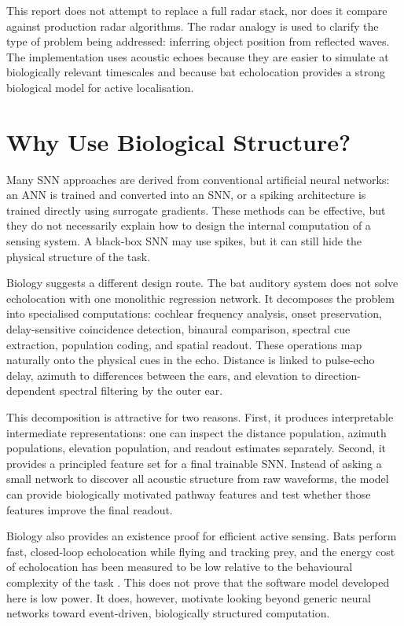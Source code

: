 This report does not attempt to replace a full radar stack, nor does it compare against production radar algorithms. The radar analogy is used to clarify the type of problem being addressed: inferring object position from reflected waves. The implementation uses acoustic echoes because they are easier to simulate at biologically relevant timescales and because bat echolocation provides a strong biological model for active localisation.

\section{Why Use Biological Structure?}

Many SNN approaches are derived from conventional artificial neural networks: an ANN is trained and converted into an SNN, or a spiking architecture is trained directly using surrogate gradients. These methods can be effective, but they do not necessarily explain how to design the internal computation of a sensing system. A black-box SNN may use spikes, but it can still hide the physical structure of the task.

Biology suggests a different design route. The bat auditory system does not solve echolocation with one monolithic regression network. It decomposes the problem into specialised computations: cochlear frequency analysis, onset preservation, delay-sensitive coincidence detection, binaural comparison, spectral cue extraction, population coding, and spatial readout. These operations map naturally onto the physical cues in the echo. Distance is linked to pulse-echo delay, azimuth to differences between the ears, and elevation to direction-dependent spectral filtering by the outer ear.

This decomposition is attractive for two reasons. First, it produces interpretable intermediate representations: one can inspect the distance population, azimuth populations, elevation population, and readout estimates separately. Second, it provides a principled feature set for a final trainable SNN. Instead of asking a small network to discover all acoustic structure from raw waveforms, the model can provide biologically motivated pathway features and test whether those features improve the final readout.

Biology also provides an existence proof for efficient active sensing. Bats perform fast, closed-loop echolocation while flying and tracking prey, and the energy cost of echolocation has been measured to be low relative to the behavioural complexity of the task \cite{Speakman1989ThePipistrellus}. This does not prove that the software model developed here is low power. It does, however, motivate looking beyond generic neural networks toward event-driven, biologically structured computation.

